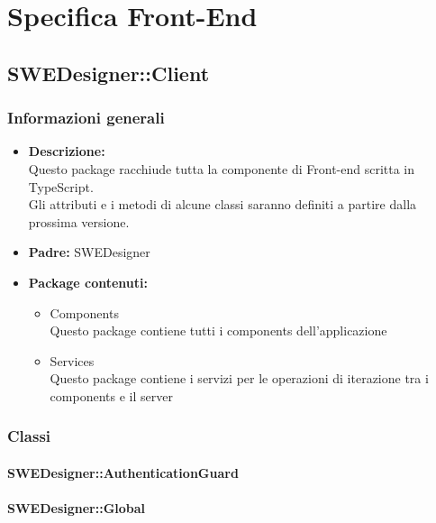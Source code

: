 \section{Specifica Front-End}
	\subsection{SWEDesigner::Client}
		\subsubsection{Informazioni generali}
			\begin{itemize}
          		\item \textbf{Descrizione:}\\
          		Questo package racchiude tutta la componente di Front-end scritta in TypeScript.\\
          		Gli attributi e i metodi di alcune classi saranno definiti a partire dalla prossima versione.
          		\item \textbf{Padre:} SWEDesigner
          		\item \textbf{Package contenuti:}\\
          		\begin{itemize}
          			\item Components\\
          			Questo package contiene tutti i components dell’applicazione
          			\item Services\\
          			Questo package contiene i servizi per le operazioni di iterazione tra i components e
il server
          		\end{itemize}
          	\end{itemize}
          	
		\subsubsection{Classi}
		
			\paragraph{SWEDesigner::AuthenticationGuard}
				
				
			\paragraph{SWEDesigner::Global}
				
          	
